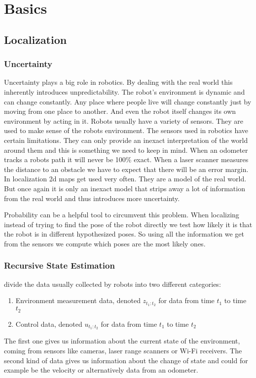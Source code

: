 \chapter{Basics} %
\label{Chapter2}

\section{Localization}
\subsection{Uncertainty}
Uncertainty plays a big role in robotics. By dealing with the real world this inherently introduces unpredictability. The robot's environment is dynamic and can change constantly. Any place where people live will change constantly just by moving from one place to another. And even the robot itself changes its own environment by acting in it. Robots usually have a variety of sensors. They are used to make sense of the robots environment. The sensors used in robotics have certain limitations. They can only provide an inexact interpretation of the world around them and this is something we need to keep in mind. When an odometer tracks a robots path it will never be 100\% exact. When a laser scanner measures the distance to an obstacle we have to expect that there will be an error margin. In localization 2d maps get used very often. They are a model of the real world. But once again it is only an inexact model that strips away a lot of information from the real world and thus introduces more uncertainty.\cite[p. 3-4]{Thrun:2005:PR:1121596}

Probability can be a helpful tool to circumvent this problem. When localizing instead of trying to find the pose of the robot directly we test how likely it is that the robot is in different hypothesized poses. So using all the information we get from the sensors we compute which poses are the most likely ones.\cite[p. 5]{Thrun:2005:PR:1121596}
\subsection{Recursive State Estimation}
\cite{Thrun:2005:PR:1121596} divide the data usually collected by robots into two different categories:
\begin{enumerate}
	\setlength\itemsep{0 em}
	\item Environment measurement data, denoted $z_{t_1:t_2}$ for data from time $t_1$ to time $t_2$
	\item Control data, denoted $u_{t_1:t_2}$ for data from time $t_1$ to time $t_2$
\end{enumerate}
The first one gives us information about the current state of the environment, coming from sensors like cameras, laser range scanners or Wi-Fi receivers. The second kind of data gives us information about the change of state and could for example be the velocity or alternatively data from an odometer. \cite[p. 22-23]{Thrun:2005:PR:1121596}

